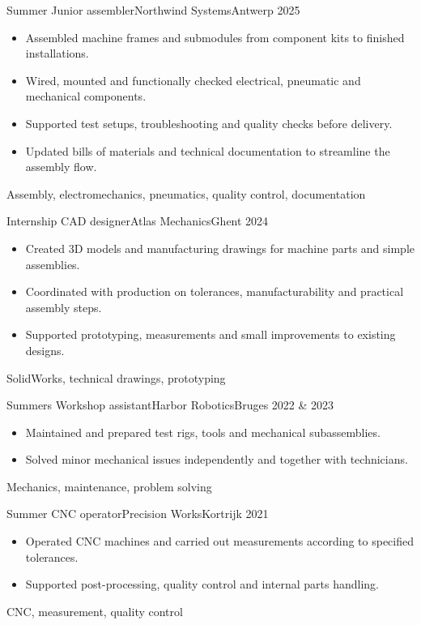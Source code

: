 \begin{experience}

    \experienceentry
    {Summer}
    {Junior assembler}{Northwind Systems}{Antwerp}
    {2025}
    {
        \begin{itemize}
            \item Assembled machine frames and submodules from component kits to finished installations.
            \item Wired, mounted and functionally checked electrical, pneumatic and mechanical components.
            \item Supported test setups, troubleshooting and quality checks before delivery.
            \item Updated bills of materials and technical documentation to streamline the assembly flow.
        \end{itemize}
    }
    {Assembly, electromechanics, pneumatics, quality control, documentation}
    \emptyseparator

    \experienceentry
    {Internship}
    {CAD designer}{Atlas Mechanics}{Ghent}
    {2024}
    {
        \begin{itemize}
            \item Created 3D models and manufacturing drawings for machine parts and simple assemblies.
            \item Coordinated with production on tolerances, manufacturability and practical assembly steps.
            \item Supported prototyping, measurements and small improvements to existing designs.
        \end{itemize}
    }
    {SolidWorks, technical drawings, prototyping}
    \emptyseparator

    \experienceentry
    {Summers}
    {Workshop assistant}{Harbor Robotics}{Bruges}
    {2022 \& 2023}
    {
        \begin{itemize}
            \item Maintained and prepared test rigs, tools and mechanical subassemblies.
            \item Solved minor mechanical issues independently and together with technicians.
        \end{itemize}
    }
    {Mechanics, maintenance, problem solving}
    \emptyseparator

    \experienceentry
    {Summer}
    {CNC operator}{Precision Works}{Kortrijk}
    {2021}
    {
        \begin{itemize}
            \item Operated CNC machines and carried out measurements according to specified tolerances.
            \item Supported post-processing, quality control and internal parts handling.
        \end{itemize}
    }
    {CNC, measurement, quality control}
    \emptyseparator


\end{experience}

